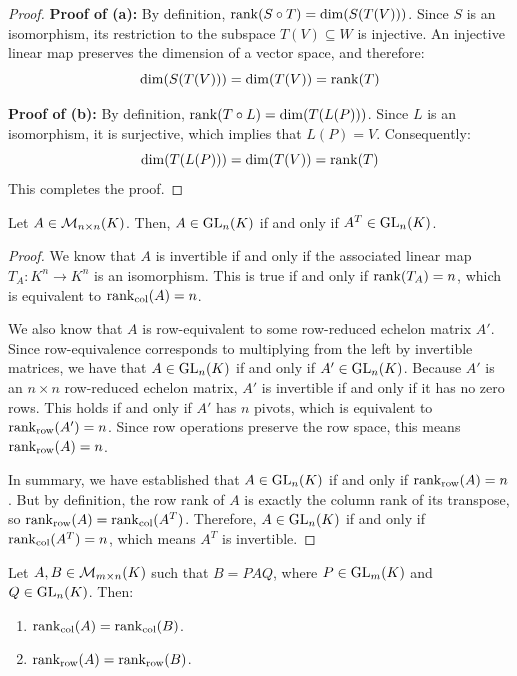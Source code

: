\begin{proof}
\textbf{Proof of (a):} By definition, $\operatorname{rank}(S \circ T) = \dim (S(T(V)))$. Since $S$ is an isomorphism, its restriction to the subspace $T(V) \subseteq W$ is injective. An injective linear map preserves the dimension of a vector space, and therefore:
\begin{equation*}
    \dim (S(T(V))) = \dim (T(V)) = \operatorname{rank}(T)
\end{equation*}

\textbf{Proof of (b):} By definition, $\operatorname{rank}(T \circ L) = \dim (T(L(P)))$. Since $L$ is an isomorphism, it is surjective, which implies that $L(P) = V$. Consequently:
\begin{equation*}
    \dim (T(L(P))) = \dim (T(V)) = \operatorname{rank}(T)
\end{equation*}
This completes the proof.
\end{proof}


\begin{lemma} \label{lemma:transpose_invertibility_v2}
Let $A \in \mathcal{M}_{n \times n}(K)$. Then, $A \in \operatorname{GL}_n(K)$ if and only if $A^T \in \operatorname{GL}_n(K)$.
\end{lemma}

\begin{proof}
We know that $A$ is invertible if and only if the associated linear map $T_A: K^n \to K^n$ is an isomorphism. This is true if and only if $\operatorname{rank}(T_A) = n$, which is equivalent to $\operatorname{rank}_{\text{col}}(A) = n$.

We also know that $A$ is row-equivalent to some row-reduced echelon matrix $A'$. Since row-equivalence corresponds to multiplying from the left by invertible matrices, we have that $A \in \operatorname{GL}_n(K)$ if and only if $A' \in \operatorname{GL}_n(K)$. Because $A'$ is an $n \times n$ row-reduced echelon matrix, $A'$ is invertible if and only if it has no zero rows. This holds if and only if $A'$ has $n$ pivots, which is equivalent to $\operatorname{rank}_{\text{row}}(A') = n$. Since row operations preserve the row space, this means $\operatorname{rank}_{\text{row}}(A) = n$.

In summary, we have established that $A \in \operatorname{GL}_n(K)$ if and only if $\operatorname{rank}_{\text{row}}(A) = n$. But by definition, the row rank of $A$ is exactly the column rank of its transpose, so $\operatorname{rank}_{\text{row}}(A) = \operatorname{rank}_{\text{col}}(A^T)$. Therefore, $A \in \operatorname{GL}_n(K)$ if and only if $\operatorname{rank}_{\text{col}}(A^T) = n$, which means $A^T$ is invertible.
\end{proof}

\begin{lemma} \label{lemma:17.c.4}
Let $A, B \in \mathcal{M}_{m \times n}(K)$ such that $B = P A Q$, where $P \in \operatorname{GL}_m(K)$ and $Q \in \operatorname{GL}_n(K)$. Then:
\begin{enumerate}
    \item $\operatorname{rank}_{\text{col}}(A) = \operatorname{rank}_{\text{col}}(B)$.
    \item $\operatorname{rank}_{\text{row}}(A) = \operatorname{rank}_{\text{row}}(B)$.
\end{enumerate}
\end{lemma}

